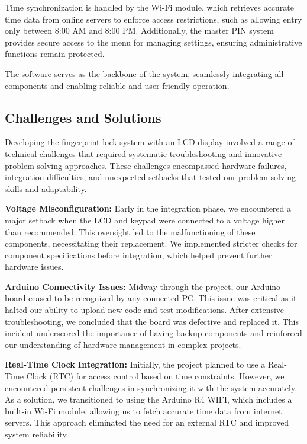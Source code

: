 \documentclass{article}
\begin{document}
Time synchronization is handled by the Wi-Fi module, which retrieves accurate time data from online servers to enforce access restrictions, such as allowing entry only between 8:00 AM and 8:00 PM. Additionally, the master PIN system provides secure access to the menu for managing settings, ensuring administrative functions remain protected.

The software serves as the backbone of the system, seamlessly integrating all components and enabling reliable and user-friendly operation.

\subsection{Challenges and Solutions}

Developing the fingerprint lock system with an LCD display involved a range of technical challenges that required systematic troubleshooting and innovative problem-solving approaches. These challenges encompassed hardware failures, integration difficulties, and unexpected setbacks that tested our problem-solving skills and adaptability.

\textbf{Voltage Misconfiguration:} Early in the integration phase, we encountered a major setback when the LCD and keypad were connected to a voltage higher than recommended. This oversight led to the malfunctioning of these components, necessitating their replacement. We implemented stricter checks for component specifications before integration, which helped prevent further hardware issues.

\textbf{Arduino Connectivity Issues:} Midway through the project, our Arduino board ceased to be recognized by any connected PC. This issue was critical as it halted our ability to upload new code and test modifications. After extensive troubleshooting, we concluded that the board was defective and replaced it. This incident underscored the importance of having backup components and reinforced our understanding of hardware management in complex projects.

\textbf{Real-Time Clock Integration:} Initially, the project planned to use a Real-Time Clock (RTC) for access control based on time constraints. However, we encountered persistent challenges in synchronizing it with the system accurately. As a solution, we transitioned to using the Arduino R4 WIFI, which includes a built-in Wi-Fi module, allowing us to fetch accurate time data from internet servers. This approach eliminated the need for an external RTC and improved system reliability.
\end{document}
